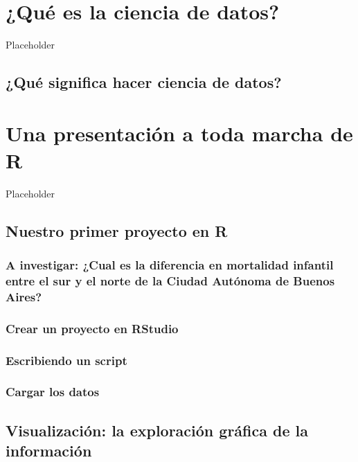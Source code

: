 \documentclass[]{book}
\begin{document}
\chapter{¿Qué es la ciencia de datos?}\label{que-es-la-ciencia-de-datos}

Placeholder

\section{¿Qué significa hacer ciencia de
datos?}\label{que-significa-hacer-ciencia-de-datos}

\chapter{Una presentación a toda marcha de
R}\label{una-presentacion-a-toda-marcha-de-r}

Placeholder

\section{Nuestro primer proyecto en
R}\label{nuestro-primer-proyecto-en-r}

\subsection{A investigar: ¿Cual es la diferencia en mortalidad infantil
entre el sur y el norte de la Ciudad Autónoma de Buenos
Aires?}\label{a-investigar-cual-es-la-diferencia-en-mortalidad-infantil-entre-el-sur-y-el-norte-de-la-ciudad-autonoma-de-buenos-aires}

\subsection{Crear un proyecto en
RStudio}\label{crear-un-proyecto-en-rstudio}

\subsection{Escribiendo un script}\label{escribiendo-un-script}

\subsection{Cargar los datos}\label{cargar-los-datos}

\section{Visualización: la exploración gráfica de la
información}\label{visualizacion-la-exploracion-grafica-de-la-informacion}
\end{document}
